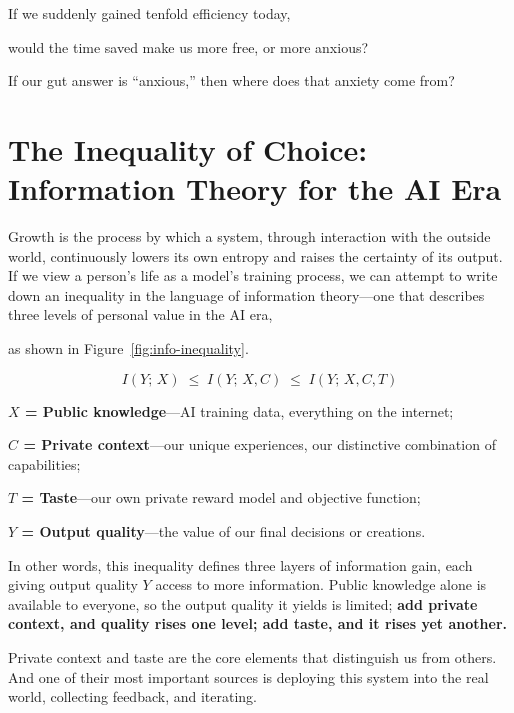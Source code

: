 \begin{thinkbox}[Reflection]
If we suddenly gained tenfold efficiency today,

would the time saved make us more free, or more anxious?

If our gut answer is ``anxious,'' then where does that anxiety come from?
\end{thinkbox}

\newpage
\section{The Inequality of Choice: Information Theory for the AI Era}

Growth is the process by which a system, through interaction with the outside world, continuously lowers its own entropy and raises the certainty of its output. If we view a person's life as a model's training process, we can attempt to write down an inequality in the language of information theory---one that describes three levels of personal value in the AI era,

as shown in Figure~\ref{fig:info-inequality}.

\begin{equation*}
\;I(Y;\, X) \;\leqslant\; I(Y;\, X, C) \;\leqslant\; I(Y;\, X, C, T)\;
\end{equation*}

\textbf{$X$ = Public knowledge}---AI training data, everything on the internet;

\textbf{$C$ = Private context}---our unique experiences, our distinctive combination of capabilities;

\textbf{$T$ = Taste}---our own private reward model and objective function;

\textbf{$Y$ = Output quality}---the value of our final decisions or creations.




In other words, this inequality defines three layers of information gain, each giving output quality $Y$ access to more information. Public knowledge alone is available to everyone, so the output quality it yields is limited; \textbf{add private context, and quality rises one level; add taste, and it rises yet another.}

Private context and taste are the core elements that distinguish us from others. And one of their most important sources is deploying this system into the real world, collecting feedback, and iterating.


